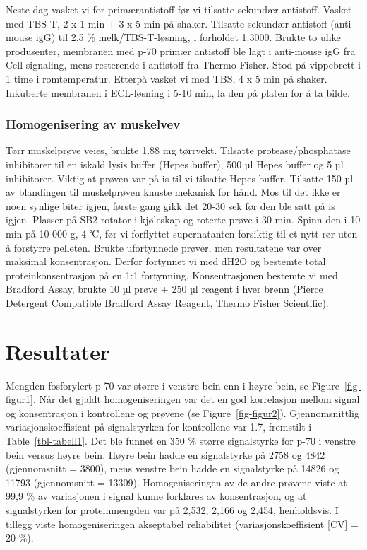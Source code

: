 \documentclass[
  letterpaper,
  DIV=11,
  numbers=noendperiod]{scrreprt}
\begin{document}
Neste dag vasket vi for primærantistoff før vi tilsatte sekundær
antistoff. Vasket med TBS-T, 2 x 1 min + 3 x 5 min på shaker. Tilsatte
sekundær antistoff (anti-mouse igG) til 2.5 \% melk/TBS-T-løsning, i
forholdet 1:3000. Brukte to ulike produsenter, membranen med p-70 primær
antistoff ble lagt i anti-mouse igG fra Cell signaling, mens resterende
i antistoff fra Thermo Fisher. Stod på vippebrett i 1 time i
romtemperatur. Etterpå vasket vi med TBS, 4 x 5 min på shaker. Inkuberte
membranen i ECL-løsning i 5-10 min, la den på platen for å ta bilde.

\hypertarget{homogenisering-av-muskelvev}{%
\subsubsection{\texorpdfstring{\textbf{Homogenisering av
muskelvev}}{Homogenisering av muskelvev}}\label{homogenisering-av-muskelvev}}

Tørr muskelprøve veies, brukte 1.88 mg tørrvekt. Tilsatte
protease/phosphatase inhibitorer til en iskald lysis buffer (Hepes
buffer), 500 µl Hepes buffer og 5 µl inhibitorer. Viktig at prøven var
på is til vi tilsatte Hepes buffer. Tilsatte 150 µl av blandingen til
muskelprøven knuste mekanisk for hånd. Mos til det ikke er noen synlige
biter igjen, første gang gikk det 20-30 sek før den ble satt på is
igjen. Plasser på SB2 rotator i kjøleskap og roterte prøve i 30 min.
Spinn den i 10 min på 10 000 g, 4 ℃, før vi forflyttet supernatanten
forsiktig til et nytt rør uten å forstyrre pelleten. Brukte ufortynnede
prøver, men resultatene var over maksimal konsentrasjon. Derfor
fortynnet vi med dH2O og bestemte total proteinkonsentrasjon på en 1:1
fortynning. Konsentrasjonen bestemte vi med Bradford Assay, brukte 10 µl
prøve + 250 µl reagent i hver brønn (Pierce Detergent Compatible
Bradford Assay Reagent, Thermo Fisher Scientific).

\hypertarget{resultater-1}{%
\section{\texorpdfstring{\textbf{Resultater}}{Resultater}}\label{resultater-1}}

Mengden fosforylert p-70 var større i venstre bein enn i høyre bein, se
Figure~\ref{fig-figur1}. Når det gjaldt homogeniseringen var det en god
korrelasjon mellom signal og konsentrasjon i kontrollene og prøvene (se
Figure~\ref{fig-figur2}). Gjennomsnittlig variasjonskoeffisient på
signalstyrken for kontrollene var 1.7, fremstilt i
Table~\ref{tbl-tabell1}. Det ble funnet en 350 \% større signalstyrke
for p-70 i venstre bein versus høyre bein. Høyre bein hadde en
signalstyrke på 2758 og 4842 (gjennomsnitt = 3800), mens venstre bein
hadde en signalstyrke på 14826 og 11793 (gjennomsnitt = 13309).
Homogeniseringen av de andre prøvene viste at 99,9 \% av variasjonen i
signal kunne forklares av konsentrasjon, og at signalstyrken for
proteinmengden var på 2,532, 2,166 og 2,454, henholdsvis. I tillegg
viste homogeniseringen akseptabel reliabilitet (variasjonskoeffisient
{[}CV{]} = 20 \%).
\end{document}
